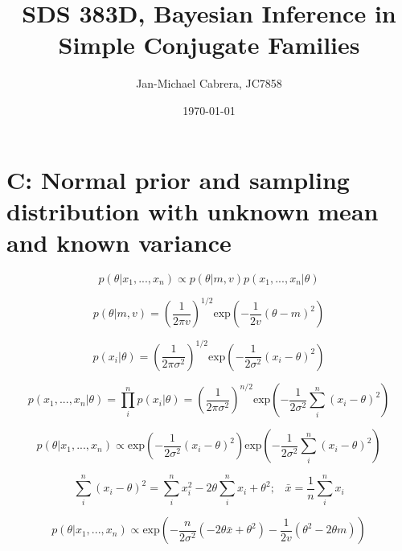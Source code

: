 \documentclass[12pt]{article}
\begin{document}
    \title{SDS 383D, Bayesian Inference in Simple Conjugate Families}
    \author{Jan-Michael Cabrera, JC7858}
    \date{\today}
    \maketitle

    \section*{C: Normal prior and sampling distribution with unknown mean and known variance}

        \begin{equation}
              p(\theta|x_1,..., x_n) \propto p(\theta|m,v)p(x_1,...,x_n|\theta)
        \end{equation}

        \begin{equation}
              p(\theta|m,v) = \left(\frac{1}{2 \pi v} \right )^{1/2} \text{exp}\left( - \frac{1}{2v} (\theta - m)^2\right )
        \end{equation}

        \begin{equation}
              p(x_i|\theta) = \left(\frac{1}{2 \pi \sigma^2} \right )^{1/2} \text{exp}\left( - \frac{1}{2 \sigma^2} (x_i - \theta)^2\right )
        \end{equation}

        \begin{equation}
              p(x_1,...,x_n|\theta) = \prod_i^n p(x_i|\theta) = \left(\frac{1}{2 \pi \sigma^2} \right )^{n/2} \text{exp}\left( - \frac{1}{2 \sigma^2} \sum_i^n(x_i - \theta)^2\right )
        \end{equation}

        \begin{equation}
              p(\theta|x_1,...,x_n) \propto \text{exp}\left( - \frac{1}{2 \sigma^2} (x_i - \theta)^2\right ) \text{exp}\left( - \frac{1}{2 \sigma^2} \sum_i^n(x_i - \theta)^2\right )
        \end{equation}

        \begin{equation}
              \sum_i^n(x_i - \theta)^2 = \sum_i^n x_i^2 - 2 \theta \sum_i^n x_i + \theta^2; \hspace{10pt} \bar{x} = \frac{1}{n}\sum_i^n x_i
        \end{equation}

        \begin{equation}
              p(\theta|x_1,...,x_n) \propto \text{exp} \left( - \frac{n}{2 \sigma^2} (-2 \theta \bar{x} + \theta^2) - \frac{1}{2v} (\theta^2 - 2\theta m) \right)
        \end{equation}
\end{document}
